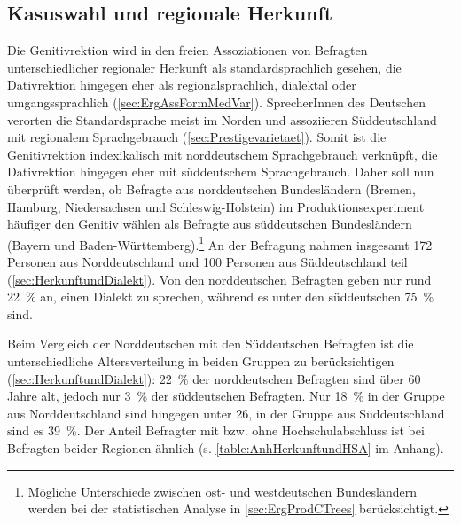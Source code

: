 \subsection{Kasuswahl und regionale Herkunft}
\label{sec:ErgProdNachHerkunft}
Die Genitivrektion wird in den freien Assoziationen von Befragten unterschiedlicher regionaler Herkunft als standardsprachlich gesehen, die Dativrektion hingegen eher als regionalsprachlich, dialektal oder umgangssprachlich (\autoref{sec:ErgAssFormMedVar}). 
SprecherInnen des Deutschen verorten die Standardsprache meist im Norden und assoziieren Süddeutschland mit regionalem Sprachgebrauch (\autoref{sec:Prestigevarietaet}). 
Somit ist die Genitivrektion indexikalisch mit norddeutschem Sprachgebrauch verknüpft, die Dativrektion hingegen eher mit süddeutschem Sprachgebrauch. 
Daher soll nun überprüft werden, ob Befragte aus norddeutschen Bundesländern (Bremen, Hamburg, Niedersachsen und Schleswig-Holstein) im Produktionsexperiment häufiger den Genitiv wählen als Befragte aus süddeutschen Bundesländern (Bayern und Baden-Württemberg).\footnote{Mögliche Unterschiede zwischen ost- und westdeutschen Bundesländern werden bei der statistischen Analyse in \autoref{sec:ErgProdCTrees} berücksichtigt.} 
An der Befragung nahmen insgesamt 172 Personen aus Norddeutschland und 100 Personen aus Süddeutschland teil (\autoref{sec:HerkunftundDialekt}). 
Von den norddeutschen Befragten geben nur rund 22~\% an, einen Dialekt zu sprechen, während es unter den süddeutschen 75~\% sind. 

Beim Vergleich der Norddeutschen mit den Süddeutschen Befragten ist die unterschiedliche Altersverteilung in beiden Gruppen zu berücksichtigen (\autoref{sec:HerkunftundDialekt}): 
22~\% der norddeutschen Befragten sind über 60 Jahre alt, jedoch nur 3~\% der süddeutschen Befragten. 
Nur 18~\% in der Gruppe aus Norddeutschland sind hingegen unter 26, in der Gruppe aus Süddeutschland sind es 39~\%. 
Der Anteil Befragter mit bzw. ohne Hochschulabschluss ist bei Befragten beider Regionen ähnlich (s. \autoref{table:AnhHerkunftundHSA} im Anhang). 

